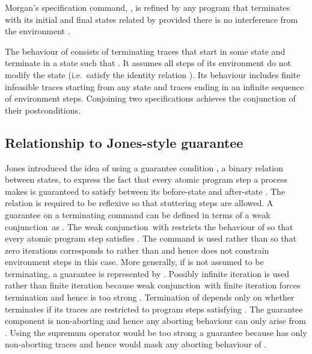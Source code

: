 \documentclass[fleqn]{fac}
\newcommand{\strictconjunction}{weak conjunction}
\begin{document}
\begin{definitionx}[iteration]
\begin{lemmax}[induction]
\begin{lawx}
\end{lawx}

Morgan's specification command, , is refined by any program 
that terminates with its initial and final states related by 
provided there is no interference from the environment
\cite{TSS}.

The behaviour of  consists of terminating traces that start in some state 
and terminate in a state  such that .
It assumes all steps of its environment do not modify the state (i.e.\ satisfy the identity relation ).
Its behaviour includes finite infeasible traces starting from any state 
and traces ending in an infinite sequence of environment steps.
Conjoining two specifications achieves the conjunction of their postconditions. 





\subsection{Relationship to Jones-style guarantee}\label{section:guarantee-jones}

Jones introduced the idea of using a guarantee condition , 
a binary relation between states, 
to express the fact that every atomic program step a process makes is guaranteed 
to satisfy  between its before-state and after-state \cite{jon83a}.
The relation  is required to be reflexive so that stuttering steps are allowed.
A guarantee  on a terminating command  can be defined in terms of 
a \strictconjunction\ as .
The \strictconjunction\ with  restricts the behaviour  of  so that
every atomic program step satisfies .
The command  is used rather than 
so that zero iterations corresponds to  rather than 
and hence does not constrain environment steps in this case.
More generally, if  is not assumed to be terminating, 
a guarantee is represented by .
Possibly infinite iteration is used rather than finite iteration 
because \strictconjunction\ with finite iteration forces termination
and hence is too strong
\cite{HayesJonesColvin14TR}.
Termination of  depends only on 
whether  terminates if its traces are restricted to program steps satisfying .
The guarantee component  is non-aborting 
and hence any aborting behaviour can only arise from .
Using the supremum operator 
would be too strong a guarantee because  has only non-aborting
traces and hence would mask any aborting behaviour of .



\end{lemmax}
\end{definitionx}
\end{document}
